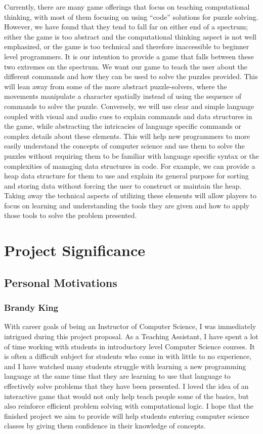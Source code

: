 \documentclass{article}
\begin{document}
Currently, there are many game offerings that focus on teaching computational
thinking, with most of them focusing on using “code” solutions for puzzle
solving. However, we have found that they tend to fall far on either end of a
spectrum; either the game is too abstract and the computational thinking aspect
is not well emphasized, or the game is too technical and therefore inaccessible
to beginner level programmers. It is our intention to provide a game that falls
between these two extremes on the spectrum. We want our game to teach the user
about the different commands and how they can be used to solve the puzzles
provided. This will lean away from some of the more abstract puzzle-solvers,
where the movements manipulate a character spatially instead of using the
sequence of commands to solve the puzzle. Conversely, we will use clear and
simple language coupled with visual and audio cues to explain commands and data
structures in the game, while abstracting the intricacies of language specific
commands or complex details about these elements. This will help new programmers
to more easily understand the concepts of computer science and use them to solve
the puzzles without requiring them to be familiar with language specific syntax
or the complexities of managing data structures in code. For example, we can
provide a heap data structure for them to use and explain its general purpose
for sorting and storing data without forcing the user to construct or maintain
the heap. Taking away the technical aspects of utilizing these elements will
allow players to focus on learning and understanding the tools they are given
and how to apply those tools to solve the problem presented.

\newpage
\section{Project Significance}

\subsection{Personal Motivations}
\subsubsection{Brandy King}
With career goals of being an Instructor of Computer Science, I was immediately
intrigued during this project proposal. As a Teaching Assistant, I have spent a
lot of time working with students in introductory level Computer Science
courses. It is often a difficult subject for students who come in with little to
no experience, and I have watched many students struggle with learning a new
programming language at the same time that they are learning to use that
language to effectively solve problems that they have been presented. I loved
the idea of an interactive game that would not only help teach people some of
the basics, but also reinforce efficient problem solving with computational
logic. I hope that the finished project we aim to provide will help students
entering computer science classes by giving them confidence in their knowledge
of concepts.\\
\end{document}
